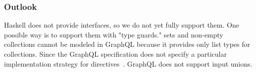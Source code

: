 \begin{frame}\frametitle{Outlook}

\begin{itemize}
      Haskell does not provide interfaces, so we do not yet fully support them. One possible way is to support them with "type guards." 
     sets and non-empty collections cannot be modeled in GraphQL because it provides only list types for collections.  
     Since the GraphQL specification does not specify a particular implementation strategy for directives~\cite{schema-directives}.
     GraphQL does not support input unions. ~\cite{gql-spec-input-unions}

\end{itemize}

\end{frame}